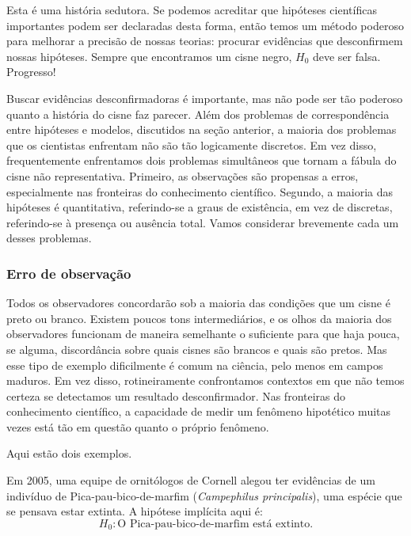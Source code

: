 Esta é uma história sedutora. Se podemos acreditar que hipóteses científicas importantes podem ser declaradas desta forma, então temos um método poderoso para melhorar a precisão de nossas teorias: procurar evidências que desconfirmem nossas hipóteses. Sempre que encontramos um cisne negro, $H_0$ deve ser falsa. Progresso!

Buscar evidências desconfirmadoras é importante, mas não pode ser tão poderoso quanto a história do cisne faz parecer. Além dos problemas de correspondência entre hipóteses e modelos, discutidos na seção anterior, a maioria dos problemas que os cientistas enfrentam não são tão logicamente discretos. Em vez disso, frequentemente enfrentamos dois problemas simultâneos que tornam a fábula do cisne não representativa. Primeiro, as observações são propensas a erros, especialmente nas fronteiras do conhecimento científico. Segundo, a maioria das hipóteses é quantitativa, referindo-se a graus de existência, em vez de discretas, referindo-se à presença ou ausência total. Vamos considerar brevemente cada um desses problemas.

\subsubsection{Erro de observação}

Todos os observadores concordarão sob a maioria das condições que um cisne é preto ou branco. Existem poucos tons intermediários, e os olhos da maioria dos observadores funcionam de maneira semelhante o suficiente para que haja pouca, se alguma, discordância sobre quais cisnes são brancos e quais são pretos. Mas esse tipo de exemplo dificilmente é comum na ciência, pelo menos em campos maduros. Em vez disso, rotineiramente confrontamos contextos em que não temos certeza se detectamos um resultado desconfirmador. Nas fronteiras do conhecimento científico, a capacidade de medir um fenômeno hipotético muitas vezes está tão em questão quanto o próprio fenômeno.

Aqui estão dois exemplos.

Em 2005, uma equipe de ornitólogos de Cornell alegou ter evidências de um indivíduo de Pica-pau-bico-de-marfim (\textit{Campephilus principalis}), uma espécie que se pensava estar extinta. A hipótese implícita aqui é:
$$H_0: \text{O Pica-pau-bico-de-marfim está extinto.}$$

